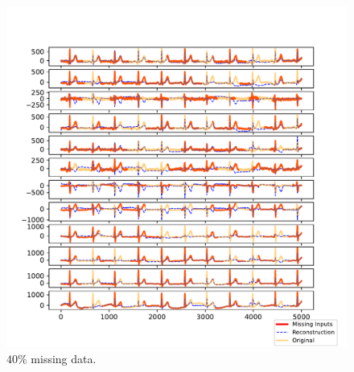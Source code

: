 \documentclass{mldsmsc}
\begin{document}
\begin{figure}[H]
\vspace{1em} %

\begin{minipage}{0.4\linewidth}
    \centering
    \includegraphics[width=\linewidth]{images/missing/tmf_output_40_10.pdf}
    \caption{$40\%$ missing data.}
\end{minipage}
\end{figure}



\end{document}
